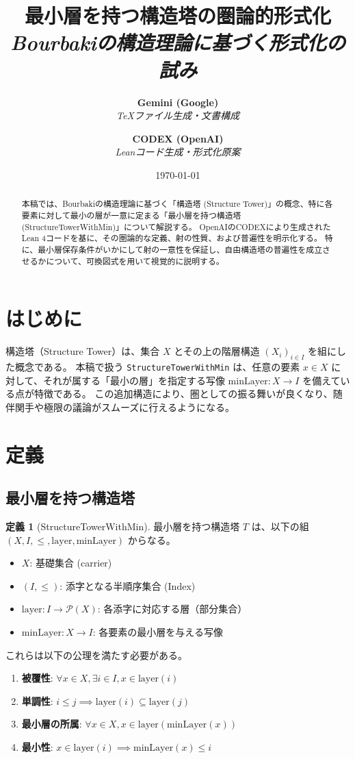 \documentclass[a4paper,11pt]{article}
\title{最小層を持つ構造塔の圏論的形式化\\
\large \textit{Bourbakiの構造理論に基づく形式化の試み}}
\author{
  \textbf{Gemini (Google)} \\
  \small \textit{TeXファイル生成・文書構成}
  \and
  \textbf{CODEX (OpenAI)} \\
  \small \textit{Leanコード生成・形式化原案}
}
\date{\today}
\theoremstyle{definition}
\newtheorem{definition}{定義}[section]
\theoremstyle{plain}
\begin{document}
\maketitle

\begin{abstract}
本稿では、Bourbakiの構造理論に基づく「構造塔 (Structure Tower)」の概念、特に各要素に対して最小の層が一意に定まる「最小層を持つ構造塔 (StructureTowerWithMin)」について解説する。
OpenAIのCODEXにより生成されたLean 4コードを基に、その圏論的な定義、射の性質、および普遍性を明示化する。
特に、最小層保存条件がいかにして射の一意性を保証し、自由構造塔の普遍性を成立させるかについて、可換図式を用いて視覚的に説明する。
\end{abstract}

\tableofcontents

\section{はじめに}
構造塔（Structure Tower）は、集合 $X$ とその上の階層構造 $(X_i)_{i \in I}$ を組にした概念である。
本稿で扱う \texttt{StructureTowerWithMin} は、任意の要素 $x \in X$ に対して、それが属する「最小の層」を指定する写像 $\mathrm{minLayer}: X \to I$ を備えている点が特徴である。
この追加構造により、圏としての振る舞いが良くなり、随伴関手や極限の議論がスムーズに行えるようになる。

\section{定義}

\subsection{最小層を持つ構造塔}

\begin{definition}[StructureTowerWithMin]
最小層を持つ構造塔 $T$ は、以下の組 $(X, I, \le, \mathrm{layer}, \mathrm{minLayer})$ からなる。
\begin{itemize}
    \item $X$: 基礎集合 (carrier)
    \item $(I, \le)$: 添字となる半順序集合 (Index)
    \item $\mathrm{layer}: I \to \mathcal{P}(X)$: 各添字に対応する層（部分集合）
    \item $\mathrm{minLayer}: X \to I$: 各要素の最小層を与える写像
\end{itemize}
これらは以下の公理を満たす必要がある。
\begin{enumerate}
    \item \textbf{被覆性}: $\forall x \in X, \exists i \in I, x \in \mathrm{layer}(i)$
    \item \textbf{単調性}: $i \le j \implies \mathrm{layer}(i) \subseteq \mathrm{layer}(j)$
    \item \textbf{最小層の所属}: $\forall x \in X, x \in \mathrm{layer}(\mathrm{minLayer}(x))$
    \item \textbf{最小性}: $x \in \mathrm{layer}(i) \implies \mathrm{minLayer}(x) \le i$
\end{enumerate}
\end{definition}
\end{document}
